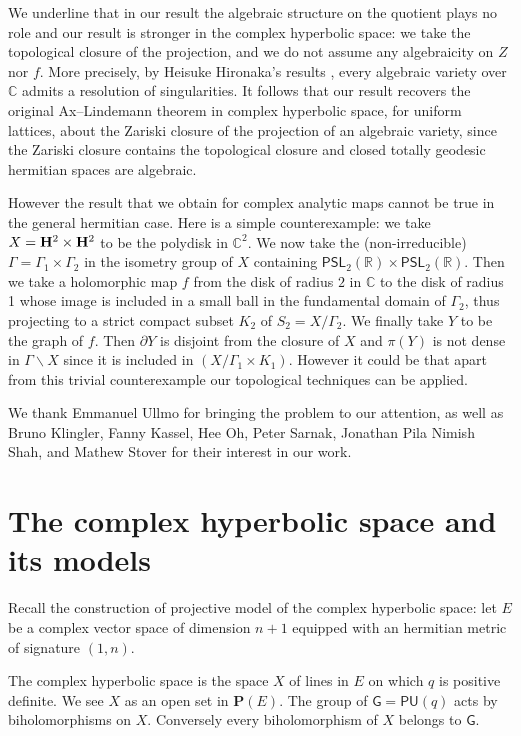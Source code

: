 \documentclass[12pt,reqno]{amsart}
\newcommand{\mG}{\ms G}
\newcommand{\psld}{\mathsf{PSL}_2(\mathbb R)}
\newcommand{\hh}{{\bf H}^2}
\newcommand{\ms}{\mathsf}
\begin{document}
We underline that in our result the algebraic structure on the quotient plays  no role and our result is stronger in the complex hyperbolic space:  we take the topological closure of the projection, and we do not assume any algebraicity on $Z$ nor $f$. More precisely, by Heisuke Hironaka's results \cite{Hironaka:1964aa,Hironaka:1964ab}, every algebraic variety over $\mathbb C$ admits a resolution of singularities. It follows that our result recovers the original Ax--Lindemann theorem in complex hyperbolic space, for uniform lattices, about the Zariski closure of the projection of an algebraic variety, since the Zariski closure contains the topological closure and closed totally geodesic hermitian spaces are algebraic.

However the result that we obtain for complex analytic maps cannot be true in the general hermitian case. Here is a simple counterexample: we take $X=\hh\times \hh$ to be the polydisk in $\mathbb C^2$. We now take the (non-irreducible) $\Gamma=\Gamma_1\times\Gamma_2$ in the isometry group of $X$ containing  $\psld\times\psld$. Then we take a holomorphic map $f$ from the disk of radius $2$ in $\mathbb C$ to the disk of radius 1 whose image is included in a small ball in the fundamental domain of $\Gamma_2$, thus projecting to a strict compact subset $K_2$ of $S_2=X/\Gamma_2$. We finally take $Y$ to be the graph of $f$. Then $\partial Y$ is disjoint from the closure of $X$ and $\pi(Y)$ is not dense in $\Gamma\backslash X$ since it is included in $(X/\Gamma_1\times K_1)$. However it could be  that apart from this trivial counterexample our topological techniques can be applied. 



We thank Emmanuel Ullmo for bringing the problem to our attention, as well as  Bruno Klingler, Fanny Kassel, Hee Oh, Peter Sarnak, Jonathan Pila Nimish Shah, and  Mathew Stover for their interest in our work.

\tableofcontents
\section{The complex hyperbolic space and its models}

Recall the construction of projective model of the complex hyperbolic space: let $E$ be a complex vector space of dimension $n+1$ equipped with an hermitian metric of signature $(1,n)$. 

The complex hyperbolic space is the space $X$  of lines in $E$ on which $q$ is positive definite. We see $X$ as an open set in $\mathbf P(E)$. The group of $\mathsf G=\mathsf{PU}(q)$ acts by biholomorphisms on $X$. Conversely every biholomorphism of $X$ belongs to $\mG$.
\end{document}
